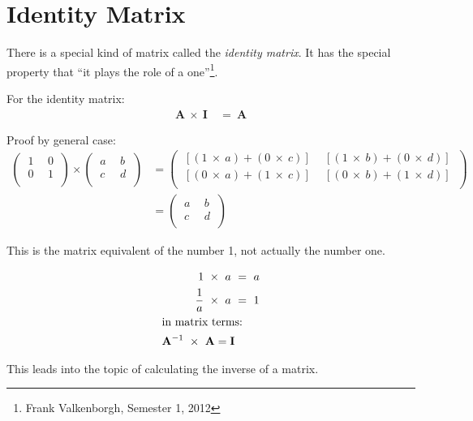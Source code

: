 \section{Identity Matrix}
\label{sec:IdentityMatrix}
There is a special kind of matrix called the \emph{identity matrix}. It has the
special property that ``it plays the role of a one''\footnote{Frank
Valkenborgh, Semester 1, 2012}.

For the identity matrix:
\begin{align}
  \mathbf{A}~\times~\mathbf{I}~&=~\mathbf{A} \nonumber
\end{align}

Proof by general case:
\begin{align}
  \begin{pmatrix}
    ~1~&~0~\\
    ~0~&~1~\\
  \end{pmatrix}
  \times
  \begin{pmatrix}
    ~a~&~b~\\
    ~c~&~d~\\
  \end{pmatrix}
  &=
  \begin{pmatrix}
    ~[(1~\times~a)+(0~\times~c)]~&~[(1~\times~b)+(0~\times~d)]~\\
    ~[(0~\times~a)+(1~\times~c)]~&~[(0~\times~b)+(1~\times~d)]~\\
  \end{pmatrix}\\
  &=
  \begin{pmatrix}
    ~a~&~b~\\
    ~c~&~d~\\
  \end{pmatrix}
\end{align}

This is the matrix equivalent of the number 1, not actually the number one.

\begin{align}
  1~\times~a~&=~a \\
  \frac{1}{a}~\times~a~&=~1 \\
  \intertext{in matrix terms:}
  \mathbf{A}^{-1}~\times~\mathbf{A} = \mathbf{I}
\end{align}

This leads into the topic of calculating the inverse of a matrix.

